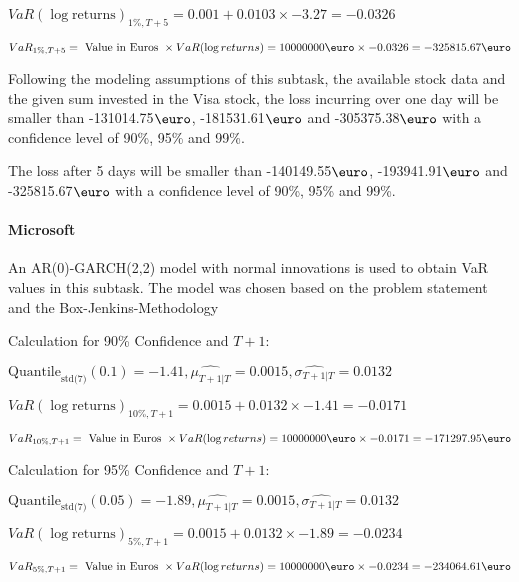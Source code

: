 \indent\indent $VaR(\log \text{returns})_{1\%, T + 5} = 0.001 + 0.0103\times-3.27 = -0.0326$

\indent\indent $VaR_{1\%, T + 5} = \text{ Value in Euros } \times VaR(\log returns) = 10 000 000 \text{\euro} \times-0.0326 = -325815.67 \text{\euro}$\newline


Following the modeling assumptions of this subtask, the available stock data and the given sum invested in the Visa stock, the loss incurring over one day will be smaller than -131014.75$\text{\euro}$, -181531.61$\text{\euro}$  and -305375.38$\text{\euro}$  with a confidence level of 90\%, 95\%  and 99\%.

The loss after 5 days will be smaller than -140149.55$\text{\euro}$, -193941.91$\text{\euro}$  and -325815.67$\text{\euro}$  with a confidence level of 90\%, 95\%  and 99\%.


\paragraph{Microsoft}
 An AR(0)-GARCH(2,2) model with normal innovations is used to obtain VaR values in this subtask. The model was chosen based on the problem statement and the Box-Jenkins-Methodology





Calculation for 90\% Confidence and $T+1$:

\indent\indent $\text{Quantile}_\text{std(7)}(0.1) = -1.41,\hat{\mu_{T+1|T}} = 0.0015, \hat{\sigma_{T+1|T}} = 0.0132$

\indent\indent $VaR(\log \text{returns})_{10\%, T + 1} = 0.0015 + 0.0132\times-1.41 = -0.0171$

\indent\indent $VaR_{10\%, T + 1} = \text{ Value in Euros } \times VaR(\log returns) = 10 000 000 \text{\euro} \times-0.0171 = -171297.95 \text{\euro}$\newline




Calculation for 95\% Confidence and $T+1$:

\indent\indent $\text{Quantile}_\text{std(7)}(0.05) = -1.89,\hat{\mu_{T+1|T}} = 0.0015, \hat{\sigma_{T+1|T}} = 0.0132$

\indent\indent $VaR(\log \text{returns})_{5\%, T + 1} = 0.0015 + 0.0132\times-1.89 = -0.0234$

\indent\indent $VaR_{5\%, T + 1} = \text{ Value in Euros } \times VaR(\log returns) = 10 000 000 \text{\euro} \times-0.0234 = -234064.61 \text{\euro}$\newline




